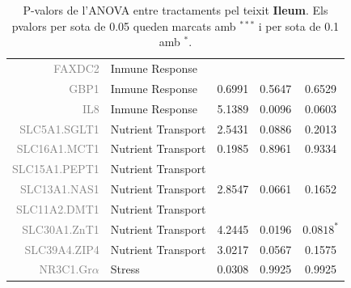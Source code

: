 \documentclass[english]{article}
\begin{document}
\begin{table}[ht]
\begin{tabular}{rlrrc}
  {\textcolor{gray}{FAXDC2}} & Inmune Response &  &  &  \\
  {\textcolor{gray}{GBP1}} & Inmune Response & 0.6991 & 0.5647 & 0.6529 \\
  {\textcolor{gray}{IL8}} & Inmune Response & 5.1389 & 0.0096 & 0.0603 \\
  {\textcolor{gray}{SLC5A1.SGLT1}} & Nutrient Transport& 2.5431 & 0.0886 & 0.2013 \\
  {\textcolor{gray}{SLC16A1.MCT1}} & Nutrient Transport & 0.1985 & 0.8961 & 0.9334 \\
  {\textcolor{gray}{SLC15A1.PEPT1}} & Nutrient Transport &  &  &  \\
  {\textcolor{gray}{SLC13A1.NAS1}} & Nutrient Transport & 2.8547 & 0.0661 & 0.1652 \\
  {\textcolor{gray}{SLC11A2.DMT1}} & Nutrient Transport &  &  &  \\
  {\textcolor{gray}{SLC30A1.ZnT1}} & Nutrient Transport & 4.2445 & 0.0196 & $0.0818^{*}$ \\
  {\textcolor{gray}{SLC39A4.ZIP4}} & Nutrient Transport & 3.0217 & 0.0567 & 0.1575 \\
  {\textcolor{gray}{NR3C1.Gr$\alpha$}} & Stress & 0.0308 & 0.9925 & 0.9925 \\
   \bottomrule
\end{tabular}
\onecolumn
\caption{P-valors de l'ANOVA entre tractaments pel teixit \textbf{Ileum}. Els pvalors per sota de 0.05 queden marcats amb $^{***}$ i per sota de 0.1 amb $^{*}$.}
\end{table}
\end{document}
